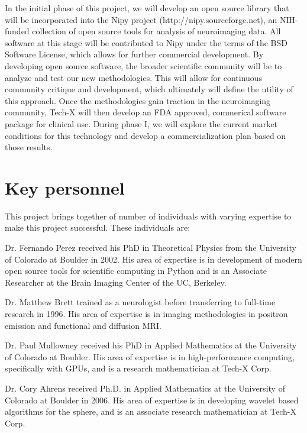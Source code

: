 \documentclass[10pt]{article}
\begin{document}
In the initial phase of this project, we will develop an open source library
that will be incorporated into the Nipy project (http://nipy.sourceforge.net),
an NIH-funded collection of open source tools for analysis of neuroimaging data.
All software at this stage will be contributed to Nipy under the terms of the
BSD Software License, which allows for further commercial development. By developing
open source software, the broader scientific community will be to analyze and test
our new methodologies. This will allow for continuous community critique and 
development, which ultimately will define the utility of this approach. Once the
methodologies gain traction in the neuroimaging community, Tech-X will then develop
an FDA approved, commerical software package for clinical use. During phase I, we will
explore the current market conditions for this technology and develop a commercialization
plan based on those results.

\vspace{-8pt}
\section*{Key personnel}
\vspace{-5pt}
This project brings together of number of individuals with varying expertise to make this project successful. These individuals are:
\begin{itemize*}
  \item{Dr. Fernando Perez received his PhD in Theoretical Physics from the University of Colorado at Boulder in 2002. His area of expertise is in development of modern open source tools for scientific computing in Python and is an Associate Researcher at the Brain Imaging Center of the UC, Berkeley.}

  \item{Dr. Matthew Brett trained as a neurologist before transferring to full-time research in 1996. His area of expertise is in imaging methodologies in positron emission and functional and diffusion MRI.}
  
  \item{Dr. Paul Mullowney received his PhD in Applied Mathematics at the University of Colorado at Boulder. His area of expertise is in high-performance computing, specifically with GPUs, and is a research mathematician at Tech-X Corp.}

  \item{Dr. Cory Ahrens received Ph.D. in Applied Mathematics at the University of Colorado at Boulder in 2006. His area of expertise is in developing wavelet based algorithms for the sphere, and is an associate research mathematician at Tech-X Corp.}
  
\end{itemize*}



\end{document}
